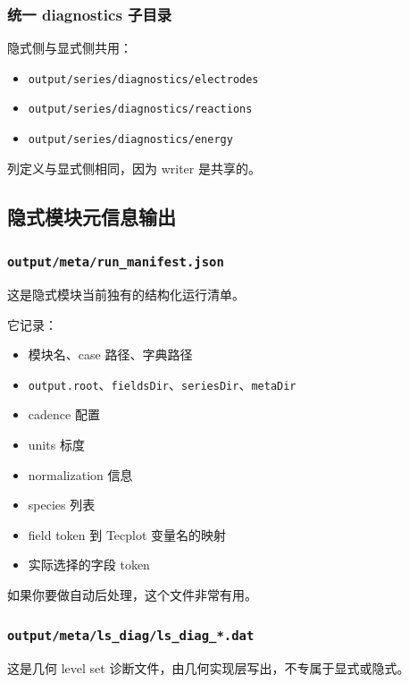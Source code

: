 \documentclass[11pt,a4paper]{ctexart}
\newcommand{\code}[1]{\texttt{#1}}
\newcommand{\file}[1]{\texttt{#1}}
\newcommand{\dir}[1]{\texttt{#1}}
\begin{document}
\subsubsection{统一 diagnostics 子目录}

隐式侧与显式侧共用：

\begin{itemize}
  \item \dir{output/series/diagnostics/electrodes}
  \item \dir{output/series/diagnostics/reactions}
  \item \dir{output/series/diagnostics/energy}
\end{itemize}

列定义与显式侧相同，因为 writer 是共享的。

\subsection{隐式模块元信息输出}

\subsubsection{\file{output/meta/run\_manifest.json}}

这是隐式模块当前独有的结构化运行清单。

它记录：

\begin{itemize}
  \item 模块名、case 路径、字典路径
  \item \code{output.root}、\code{fieldsDir}、\code{seriesDir}、\code{metaDir}
  \item cadence 配置
  \item units 标度
  \item normalization 信息
  \item species 列表
  \item field token 到 Tecplot 变量名的映射
  \item 实际选择的字段 token
\end{itemize}

如果你要做自动后处理，这个文件非常有用。

\subsubsection{\file{output/meta/ls\_diag/ls\_diag\_*.dat}}

这是几何 level set 诊断文件，由几何实现层写出，不专属于显式或隐式。
\end{document}
